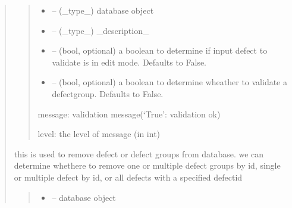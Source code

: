 \documentclass[letterpaper,10pt,english]{sphinxmanual}
\begin{document}
\begin{quote}
\begin{savenotes}
\begin{fulllineitems}
\begin{quote}
\begin{description}
\begin{itemize}
\item {} 
\sphinxAtStartPar
{} – (\_type\_) database object

\item {} 
\sphinxAtStartPar
{} – (\_type\_) \_description\_

\item {} 
\sphinxAtStartPar
{} – (bool, optional) a boolean to determine if input defect to validate is in edit mode. Defaults to False.

\item {} 
\sphinxAtStartPar
{} – (bool, optional) a boolean to determine wheather to validate a defect\sphinxhyphen{}group. Defaults to False.

\end{itemize}

\sphinxAtStartPar
message: validation message(‘True’: validation ok)

\sphinxAtStartPar
level: the level of message (in int)

\end{description}\end{quote}

\end{fulllineitems}\end{savenotes}


\begin{savenotes}\begin{fulllineitems}
\label{\detokenize{setting/backend/defect_management_funcs:oxin.backend.defect_management_funcs.remove_defects_from_db}}
\pysigstartsignatures
{}
\pysigstopsignatures
\sphinxAtStartPar
this is used to remove defect or defect groups from database.
we can determine whethere to remove one or multiple defect groups by id, single or multiple defect by id, or all defects with a specified defect\sphinxhyphen{}id
\begin{quote}\begin{description}
\begin{itemize}
\item {} 
\sphinxAtStartPar
{} – database object


\end{itemize}
\end{description}
\end{quote}
\end{fulllineitems}
\end{savenotes}
\end{quote}
\end{document}
